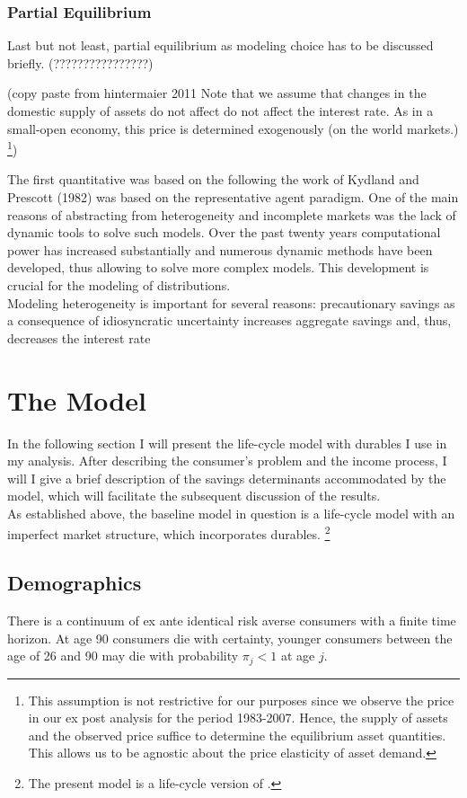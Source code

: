 \documentclass[a4paper,12pt]{article}
\begin{document}
\subsubsection{Partial Equilibrium}
Last but not least, partial equilibrium as modeling choice has to be discussed briefly. (????????????????)

(copy paste from hintermaier 2011
Note that we assume that changes in the domestic supply of assets do not affect do not affect the interest rate. As in a small-open economy, this price is determined exogenously (on the world markets.) \footnote{This assumption is not restrictive for our purposes since we observe the price in our ex post analysis for the period 1983-2007. Hence, the supply of assets and the observed price suffice to determine the equilibrium asset quantities. This allows us to be agnostic about the price elasticity of asset demand.})

The first quantitative was based on the following the work of Kydland and Prescott (1982) was based on the representative agent paradigm. One of the main reasons of abstracting from heterogeneity and incomplete markets was the lack of dynamic tools to solve such models. \cite{heathcote2009quantitative} Over the past twenty years computational power has increased substantially and numerous dynamic methods have been developed, thus allowing to solve more complex models. This development is crucial for the modeling of distributions. \\
Modeling heterogeneity is important for several reasons: precautionary savings as a consequence of idiosyncratic uncertainty increases aggregate savings and, thus, decreases the interest rate \cite{huggett1993risk}


\section{The Model}
In the following section I will present the life-cycle model with durables I use in my analysis. After describing the consumer's problem and the income process, I will I give a brief description of the savings determinants accommodated by the model, which will facilitate the subsequent discussion of the results. 
\\
As established above, the baseline model in question is a life-cycle model with an imperfect market structure, which incorporates durables. \footnote{The present model is a life-cycle version of  \cite{hintermaier2010}.} 
\subsection{Demographics}
There is a continuum of ex ante identical risk averse consumers with a finite time horizon. At age 90 consumers die with certainty, younger consumers between the age of 26 and 90 may die with probability $\pi_{j} < 1$ at age $j$.
\end{document}
